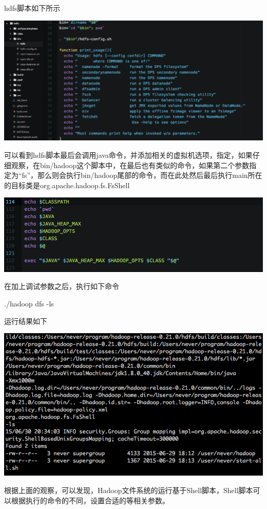 hdfs脚本如下所示

\includegraphics[width=\textwidth]{image/env/cr18.png}

可以看到hdfs脚本最后会调用java命令，并添加相关的虚拟机选项，指定{\CPATH}，如果仔细观察，在bin/hadoop这个脚本中，在最后也有类似的命令，如果第二个参数指定为``fs''，那么则会执行bin/hadoop尾部的命令，而在此处然后最后执行main所在的目标类是org.apache.hadoop.fs.FsShell

\includegraphics[width=\textwidth]{image/env/cr19.png}

在加上调试参数之后，执行如下命令

	 ./hadoop dfs -ls

运行结果如下

\includegraphics[width=\textwidth]{image/env/cr20.png}

根据上面的观察，可以发现，Hadoop文件系统的运行基于Shell脚本，Shell脚本可以根据执行的命令的不同，设置合适的{\CPATH}等相关参数。

